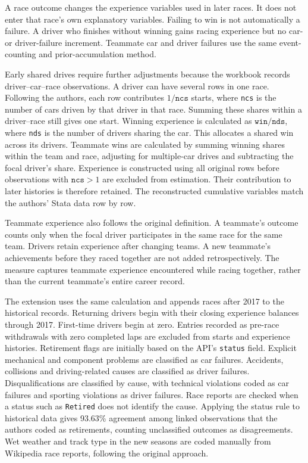 \documentclass[11pt,letterpaper]{article}
\newcommand{\vname}[1]{\texttt{#1}}
\begin{document}


A race outcome changes the experience variables used in later races. It does not enter that race's own explanatory variables. Failing to win is not automatically a failure. A driver who finishes without winning gains racing experience but no car- or driver-failure increment. Teammate car and driver failures use the same event-counting and prior-accumulation method.

Early shared drives require further adjustments because the workbook records driver--car--race observations. A driver can have several rows in one race. Following the authors, each row contributes $1/\vname{ncs}$ starts, where \vname{ncs} is the number of cars driven by that driver in that race. Summing these shares within a driver--race still gives one start. Winning experience is calculated as $\vname{win}/\vname{nds}$, where \vname{nds} is the number of drivers sharing the car. This allocates a shared win across its drivers. Teammate wins are calculated by summing winning shares within the team and race, adjusting for multiple-car drives and subtracting the focal driver's share. Experience is constructed using all original rows before observations with $\vname{ncs}>1$ are excluded from estimation. Their contribution to later histories is therefore retained. The reconstructed cumulative variables match the authors' Stata data row by row.

Teammate experience also follows the original definition. A teammate's outcome counts only when the focal driver participates in the same race for the same team. Drivers retain experience after changing teams. A new teammate's achievements before they raced together are not added retrospectively. The measure captures teammate experience encountered while racing together, rather than the current teammate's entire career record.

The extension uses the same calculation and appends races after 2017 to the historical records. Returning drivers begin with their closing experience balances through 2017. First-time drivers begin at zero. Entries recorded as pre-race withdrawals with zero completed laps are excluded from starts and experience histories. Retirement flags are initially based on the API's \vname{status} field. Explicit mechanical and component problems are classified as car failures. Accidents, collisions and driving-related causes are classified as driver failures. Disqualifications are classified by cause, with technical violations coded as car failures and sporting violations as driver failures. Race reports are checked when a status such as \vname{Retired} does not identify the cause. Applying the status rule to historical data gives 93.63\% agreement among linked observations that the authors coded as retirements, counting unclassified outcomes as disagreements. Wet weather and track type in the new seasons are coded manually from Wikipedia race reports, following the original approach.
\end{document}
